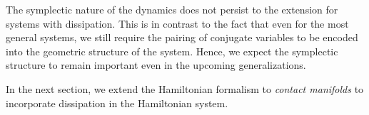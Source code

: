 The symplectic nature of the dynamics does not persist to the extension for systems with dissipation. This is in contrast to the fact that even for the most general systems, we still require the pairing of conjugate variables to be encoded into the geometric structure of the system. Hence, we expect the symplectic structure to remain important even in the upcoming generalizations.

In the next section, we extend the Hamiltonian formalism to \emph{contact manifolds} to incorporate dissipation in the Hamiltonian system.
